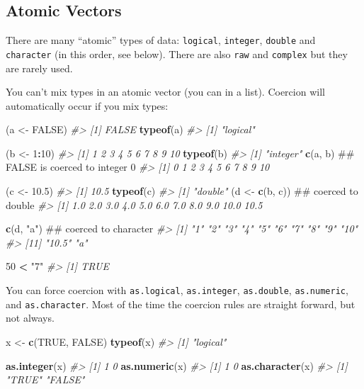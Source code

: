 \documentclass[]{book}
\newenvironment{Shaded}{\begin{snugshade}}{\end{snugshade}}
\newcommand{\KeywordTok}[1]{\textcolor[rgb]{0.13,0.29,0.53}{\textbf{#1}}}
\newcommand{\DecValTok}[1]{\textcolor[rgb]{0.00,0.00,0.81}{#1}}
\newcommand{\FloatTok}[1]{\textcolor[rgb]{0.00,0.00,0.81}{#1}}
\newcommand{\StringTok}[1]{\textcolor[rgb]{0.31,0.60,0.02}{#1}}
\newcommand{\CommentTok}[1]{\textcolor[rgb]{0.56,0.35,0.01}{\textit{#1}}}
\newcommand{\OtherTok}[1]{\textcolor[rgb]{0.56,0.35,0.01}{#1}}
\newcommand{\OperatorTok}[1]{\textcolor[rgb]{0.81,0.36,0.00}{\textbf{#1}}}
\newcommand{\NormalTok}[1]{#1}
\begin{document}
\subsection{Atomic Vectors}\label{atomic-vectors}

There are many ``atomic'' types of data: \texttt{logical},
\texttt{integer}, \texttt{double} and \texttt{character} (in this order,
see below). There are also \texttt{raw} and \texttt{complex} but they
are rarely used.

You can't mix types in an atomic vector (you can in a list). Coercion
will automatically occur if you mix types:

\begin{Shaded}
\begin{Highlighting}[]
\NormalTok{(a <-}\StringTok{ }\OtherTok{FALSE}\NormalTok{)}
\CommentTok{#> [1] FALSE}
\KeywordTok{typeof}\NormalTok{(a)}
\CommentTok{#> [1] "logical"}

\NormalTok{(b <-}\StringTok{ }\DecValTok{1}\OperatorTok{:}\DecValTok{10}\NormalTok{)}
\CommentTok{#>  [1]  1  2  3  4  5  6  7  8  9 10}
\KeywordTok{typeof}\NormalTok{(b)}
\CommentTok{#> [1] "integer"}
\KeywordTok{c}\NormalTok{(a, b)         ## FALSE is coerced to integer 0}
\CommentTok{#>  [1]  0  1  2  3  4  5  6  7  8  9 10}

\NormalTok{(c <-}\StringTok{ }\FloatTok{10.5}\NormalTok{)}
\CommentTok{#> [1] 10.5}
\KeywordTok{typeof}\NormalTok{(c)}
\CommentTok{#> [1] "double"}
\NormalTok{(d <-}\StringTok{ }\KeywordTok{c}\NormalTok{(b, c))  ## coerced to double}
\CommentTok{#>  [1]  1.0  2.0  3.0  4.0  5.0  6.0  7.0  8.0  9.0 10.0 10.5}

\KeywordTok{c}\NormalTok{(d, }\StringTok{"a"}\NormalTok{)       ## coerced to character}
\CommentTok{#>  [1] "1"    "2"    "3"    "4"    "5"    "6"    "7"    "8"    "9"    "10"  }
\CommentTok{#> [11] "10.5" "a"}

\DecValTok{50} \OperatorTok{<}\StringTok{ "7"}
\CommentTok{#> [1] TRUE}
\end{Highlighting}
\end{Shaded}

You can force coercion with \texttt{as.logical}, \texttt{as.integer},
\texttt{as.double}, \texttt{as.numeric}, and \texttt{as.character}. Most
of the time the coercion rules are straight forward, but not always.

\begin{Shaded}
\begin{Highlighting}[]
\NormalTok{x <-}\StringTok{ }\KeywordTok{c}\NormalTok{(}\OtherTok{TRUE}\NormalTok{, }\OtherTok{FALSE}\NormalTok{)}
\KeywordTok{typeof}\NormalTok{(x)}
\CommentTok{#> [1] "logical"}

\KeywordTok{as.integer}\NormalTok{(x)}
\CommentTok{#> [1] 1 0}
\KeywordTok{as.numeric}\NormalTok{(x)}
\CommentTok{#> [1] 1 0}
\KeywordTok{as.character}\NormalTok{(x)}
\CommentTok{#> [1] "TRUE"  "FALSE"}
\end{Highlighting}
\end{Shaded}
\end{document}
